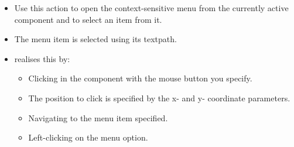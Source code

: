 
\begin{itemize}
\item Use this action to open the context-sensitive menu from the currently active component and to select an item from it.
\item The menu item is selected using its textpath. 
\item \jb{} realises this by:
\begin{itemize}
\item Clicking in the component with the mouse button you specify.
\item The position to click is specified by the x- and y- coordinate parameters.
\item Navigating to the menu item specified.
\item Left-clicking on the menu option.  
\end{itemize}
\end{itemize}



